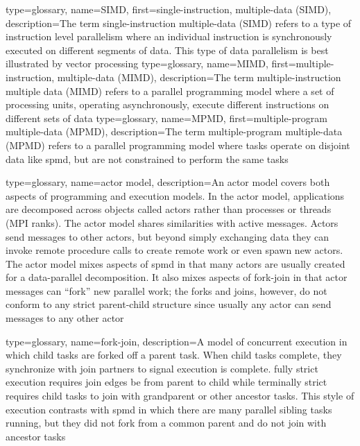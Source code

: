 {
  type=glossary,
  name={SIMD},
  first={single-instruction, multiple-data (SIMD)},
  description={The term single-instruction multiple-data (SIMD) refers to a type of instruction level parallelism where an individual instruction is synchronously executed on different segments of data. This type of \gls{data parallelism} is best illustrated by \gls{vector processing}}
}
{
  type=glossary,
  name={MIMD},
  first={multiple-instruction, multiple-data (MIMD)},
  description={The term multiple-instruction multiple data (MIMD) refers to a parallel \gls{programming model} where a set of processing units, operating asynchronously, execute different instructions on different sets of data}
}
{
  type=glossary,
  name={MPMD},
  first={multiple-program multiple-data (MPMD)},
  description={The term multiple-program multiple-data (MPMD) refers to a
    parallel programming model where tasks operate on disjoint data like \gls{spmd}, but are not constrained to perform the same tasks}
}

{
  type=glossary,
  name={actor model},
  description={An actor model covers both aspects of programming and
    \glspl{execution model}.  In the actor model,
  applications are decomposed across objects called actors rather than processes or threads (\gls{MPI} ranks). The actor model shares similarities with active messages.  Actors send messages to other actors, but beyond simply exchanging data they can invoke remote procedure calls to create remote work or even spawn new actors.  The actor model mixes aspects of \gls{spmd} in that many actors are usually created for a data-parallel decomposition.  It also mixes aspects of \gls{fork-join} in that actor messages can ``fork'' new parallel work; the forks and joins, however, do not conform to any strict parent-child structure since usually any actor can send messages to any other actor}  
}

{
  type=glossary,
  name={fork-join},
  description={A model of concurrent execution in which child tasks are forked
    off a parent task.  When child tasks complete, they synchronize with join
      partners to signal execution is complete.  \Gls{fully strict} execution
      requires join edges be from parent to child while \gls{terminally strict} requires child tasks to join with grandparent or other ancestor tasks. This style of execution contrasts with \gls{spmd} in which there are many parallel sibling tasks running, but they did not fork from a common parent and do not join with ancestor tasks}
}

